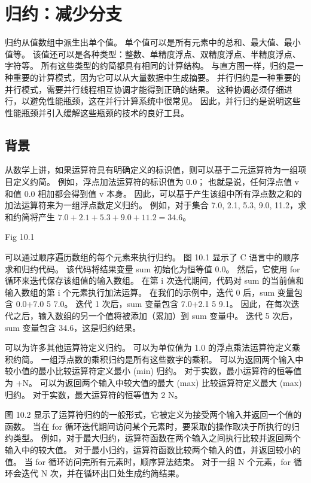 \section{归约：减少分支}
归约从值数组中派生出单个值。 单个值可以是所有元素中的总和、最大值、最小值等。 
该值还可以是各种类型：整数、单精度浮点、双精度浮点、半精度浮点、字符等。 所有这些类型的约简都具有相同的计算结构。 
与直方图一样，归约是一种重要的计算模式，因为它可以从大量数据中生成摘要。 
并行归约是一种重要的并行模式，需要并行线程相互协调才能得到正确的结果。 
这种协调必须仔细进行，以避免性能瓶颈，这在并行计算系统中很常见。 
因此，并行归约是说明这些性能瓶颈并引入缓解这些瓶颈的技术的良好工具。

\subsection{背景}
从数学上讲，如果运算符具有明确定义的标识值，则可以基于二元运算符为一组项目定义约简。 
例如，浮点加法运算符的标识值为 0.0； 也就是说，任何浮点值 v 和值 0.0 相加都会得到值 v 本身。 
因此，可以基于产生该组中所有浮点数之和的加法运算符来为一组浮点数定义归约。 
例如，对于集合 {7.0, 2.1, 5.3, 9.0, 11.2}，求和约简将产生 $7.0+2.1 +5.3+9.0+11.2 = 34.6$。

{\color{red} Fig 10.1}

可以通过顺序遍历数组的每个元素来执行归约。 图 10.1 显示了 C 语言中的顺序求和归约代码。
该代码将结果变量 sum 初始化为恒等值 0.0。 然后，它使用 for 循环来迭代保存该组值的输入数组。 
在第 i 次迭代期间，代码对 sum 的当前值和输入数组的第 i 个元素执行加法运算。 
在我们的示例中，迭代 0 后，sum 变量包含 0.0+7.0 5 7.0。 迭代 1 次后，sum 变量包含 7.0+2.1 5 9.1。 
因此，在每次迭代之后，输入数组的另一个值将被添加（累加）到 sum 变量中。 迭代 5 次后，sum 变量包含 34.6，这是归约结果。

可以为许多其他运算符定义归约。 可以为单位值为 1.0 的浮点乘法运算符定义乘积约简。 
一组浮点数的乘积归约是所有这些数字的乘积。 可以为返回两个输入中较小值的最小比较运算符定义最小 (min) 归约。 
对于实数，最小运算符的恒等值为 +N。 可以为返回两个输入中较大值的最大 (max) 比较运算符定义最大 (max) 归约。 
对于实数，最大运算符的恒等值为 2 N。

图 10.2 显示了运算符归约的一般形式，它被定义为接受两个输入并返回一个值的函数。 
当在 for 循环迭代期间访问某个元素时，要采取的操作取决于所执行的归约类型。 
例如，对于最大归约，运算符函数在两个输入之间执行比较并返回两个输入中的较大值。 
对于最小归约，运算符函数比较两个输入的值，并返回较小的值。 当 for 循环访问完所有元素时，顺序算法结束。 
对于一组 N 个元素，for 循环会迭代 N 次，并在循环出口处生成约简结果。

